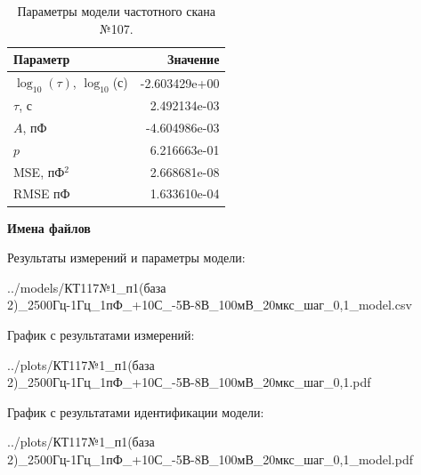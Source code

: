 \begin{table}[!ht]
    \centering
    \caption{Параметры модели частотного скана №107.}
    \begin{tabular}{|l|r|}
        \hline
        Параметр                                       & Значение                  \\ \hline
        $\log_{10}(\tau)$, $\log_{10}$(с)              & -2.603429e+00             \\ \hline
        $\tau$, с                                      & 2.492134e-03              \\ \hline
        $A$, пФ                                        & -4.604986e-03             \\ \hline
        $p$                                            & 6.216663e-01              \\ \hline
        MSE, пФ$^2$                                    & 2.668681e-08              \\ \hline
        RMSE пФ                                        & 1.633610e-04              \\ \hline
    \end{tabular}
    \label{table:frequency_scan_model_107}
\end{table}

\textbf{Имена файлов}

Результаты измерений и параметры модели:

\scriptsize../models/КТ117№1\_п1(база 2)\_2500Гц-1Гц\_1пФ\_+10С\_-5В-8В\_100мВ\_20мкс\_шаг\_0,1\_model.csv
\normalsize

График с результатами измерений:

\scriptsize../plots/КТ117№1\_п1(база 2)\_2500Гц-1Гц\_1пФ\_+10С\_-5В-8В\_100мВ\_20мкс\_шаг\_0,1.pdf
\normalsize

График с результатами идентификации модели:

\scriptsize../plots/КТ117№1\_п1(база 2)\_2500Гц-1Гц\_1пФ\_+10С\_-5В-8В\_100мВ\_20мкс\_шаг\_0,1\_model.pdf
\normalsize

